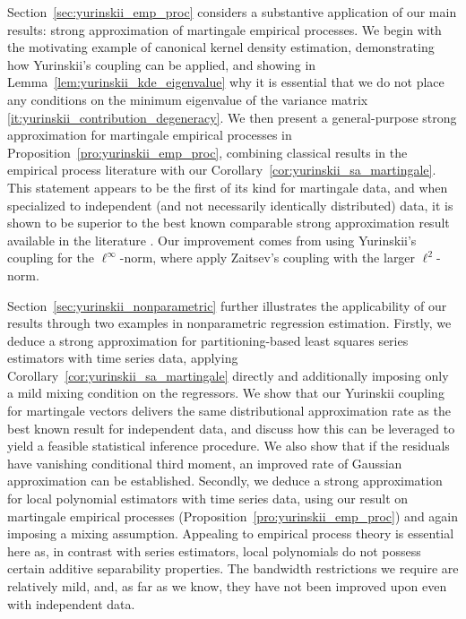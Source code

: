 Section~\ref{sec:yurinskii_emp_proc} considers a substantive application of our
main
results: strong approximation of martingale empirical processes. We begin with
the motivating example of canonical kernel density estimation, demonstrating
how Yurinskii's coupling can be applied, and showing in
Lemma~\ref{lem:yurinskii_kde_eigenvalue} why it is essential that we do not
place any
conditions on the minimum eigenvalue of the variance matrix
\ref{it:yurinskii_contribution_degeneracy}.
We then present a general-purpose strong
approximation for martingale empirical processes in
Proposition~\ref{pro:yurinskii_emp_proc}, combining classical results in the
empirical
process literature \citep{van1996weak} with our
Corollary~\ref{cor:yurinskii_sa_martingale}. This statement appears to be the
first of
its kind for martingale data, and when specialized to independent
(and not necessarily identically distributed) data, it is
shown to be superior to the best known comparable strong approximation result
available in the literature \citep{berthet2006revisiting}. Our improvement
comes from using Yurinskii's coupling for the $\ell^\infty$-norm, where
\citet{berthet2006revisiting} apply Zaitsev's coupling
\citep{zaitsev1987estimates, zaitsev1987gaussian} with the larger
$\ell^2$-norm.

Section~\ref{sec:yurinskii_nonparametric} further illustrates the applicability
of our
results through two examples in nonparametric regression estimation. Firstly,
we deduce a strong approximation for partitioning-based least squares series
estimators with time series data, applying
Corollary~\ref{cor:yurinskii_sa_martingale}
directly and additionally imposing only a mild mixing condition on the
regressors. We show that our Yurinskii coupling for martingale vectors delivers
the same distributional approximation rate as the best known result for
independent data, and discuss how this can be leveraged to yield a feasible
statistical inference procedure. We also show that if the residuals have
vanishing conditional third moment, an improved rate of Gaussian approximation
can be established. Secondly, we deduce a strong approximation for local
polynomial estimators with time series data,
using our result on martingale empirical processes
(Proposition~\ref{pro:yurinskii_emp_proc}) and again imposing a mixing
assumption.
Appealing to empirical process theory is essential here as, in contrast with
series estimators, local polynomials do not possess certain additive
separability properties. The bandwidth restrictions we require are relatively
mild, and, as far as we know, they have not been improved upon even with
independent data.

